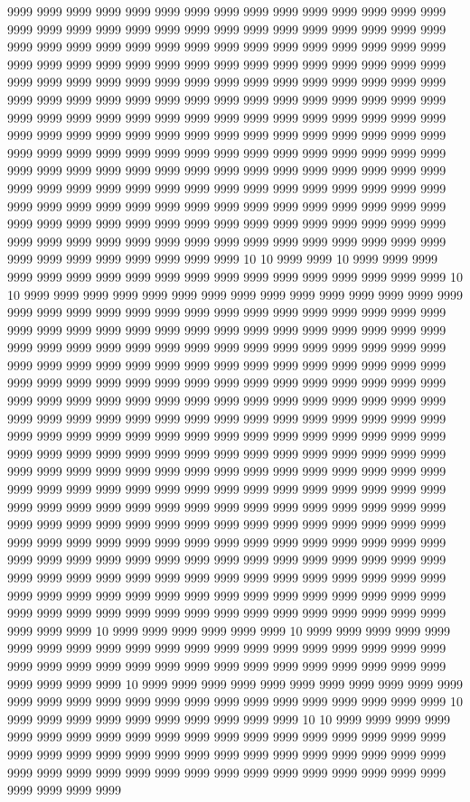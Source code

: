 9999 9999 9999 9999 9999 9999 9999 9999 9999 9999 9999 9999 9999 9999 9999 9999 9999 9999 9999 9999 9999 9999 9999 9999 9999 9999 9999 9999 9999 9999 9999 9999 9999 9999 9999 9999 9999 9999 9999 9999 9999 9999 9999 9999 9999 9999 9999 9999 9999 9999 9999 9999 9999 9999 9999 9999 9999 9999 9999 9999 9999 9999 9999 9999 9999 9999 9999 9999 9999 9999 9999 9999 9999 9999 9999 9999 9999 9999 9999 9999 9999 9999 9999 9999 9999 9999 9999 9999 9999 9999 9999 9999 9999 9999 9999 9999 9999 9999 9999 9999 9999 9999 9999 9999 9999 9999 9999 9999 9999 9999 9999 9999 9999 9999 9999 9999 9999 9999 9999 9999 9999 9999 9999 9999 9999 9999 9999 9999 9999 9999 9999 9999 9999 9999 9999 9999 9999 9999 9999 9999 9999 9999 9999 9999 9999 9999 9999 9999 9999 9999 9999 9999 9999 9999 9999 9999 9999 9999 9999 9999 9999 9999 9999 9999 9999 9999 9999 9999 9999 9999 9999 9999 9999 9999 9999 9999 9999 9999 9999 9999 9999 9999 9999 9999 9999 9999 9999 9999 9999 9999 9999 9999 9999 9999 9999 9999 9999 9999 9999 9999 9999 9999 9999 9999 9999 9999 9999 9999 9999 9999 9999 9999 9999 9999 9999 9999 9999 9999 10 10 9999 9999 10 9999 9999 9999 9999 9999 9999 9999 9999 9999 9999 9999 9999 9999 9999 9999 9999 9999 9999 10 10 9999 9999 9999 9999 9999 9999 9999 9999 9999 9999 9999 9999 9999 9999 9999 9999 9999 9999 9999 9999 9999 9999 9999 9999 9999 9999 9999 9999 9999 9999 9999 9999 9999 9999 9999 9999 9999 9999 9999 9999 9999 9999 9999 9999 9999 9999 9999 9999 9999 9999 9999 9999 9999 9999 9999 9999 9999 9999 9999 9999 9999 9999 9999 9999 9999 9999 9999 9999 9999 9999 9999 9999 9999 9999 9999 9999 9999 9999 9999 9999 9999 9999 9999 9999 9999 9999 9999 9999 9999 9999 9999 9999 9999 9999 9999 9999 9999 9999 9999 9999 9999 9999 9999 9999 9999 9999 9999 9999 9999 9999 9999 9999 9999 9999 9999 9999 9999 9999 9999 9999 9999 9999 9999 9999 9999 9999 9999 9999 9999 9999 9999 9999 9999 9999 9999 9999 9999 9999 9999 9999 9999 9999 9999 9999 9999 9999 9999 9999 9999 9999 9999 9999 9999 9999 9999 9999 9999 9999 9999 9999 9999 9999 9999 9999 9999 9999 9999 9999 9999 9999 9999 9999 9999 9999 9999 9999 9999 9999 9999 9999 9999 9999 9999 9999 9999 9999 9999 9999 9999 9999 9999 9999 9999 9999 9999 9999 9999 9999 9999 9999 9999 9999 9999 9999 9999 9999 9999 9999 9999 9999 9999 9999 9999 9999 9999 9999 9999 9999 9999 9999 9999 9999 9999 9999 9999 9999 9999 9999 9999 9999 9999 9999 9999 9999 9999 9999 9999 9999 9999 9999 9999 9999 9999 9999 9999 9999 9999 9999 9999 9999 9999 9999 9999 9999 9999 9999 9999 9999 9999 9999 9999 9999 9999 9999 9999 9999 9999 9999 9999 9999 9999 9999 9999 9999 9999 9999 9999 9999 9999 9999 9999 9999 9999 9999 9999 9999 9999 9999 10 9999 9999 9999 9999 9999 9999 10 9999 9999 9999 9999 9999 9999 9999 9999 9999 9999 9999 9999 9999 9999 9999 9999 9999 9999 9999 9999 9999 9999 9999 9999 9999 9999 9999 9999 9999 9999 9999 9999 9999 9999 9999 9999 9999 9999 9999 10 9999 9999 9999 9999 9999 9999 9999 9999 9999 9999 9999 9999 9999 9999 9999 9999 9999 9999 9999 9999 9999 9999 9999 9999 9999 9999 10 9999 9999 9999 9999 9999 9999 9999 9999 9999 9999 10 10 9999 9999 9999 9999 9999 9999 9999 9999 9999 9999 9999 9999 9999 9999 9999 9999 9999 9999 9999 9999 9999 9999 9999 9999 9999 9999 9999 9999 9999 9999 9999 9999 9999 9999 9999 9999 9999 9999 9999 9999 9999 9999 9999 9999 9999 9999 9999 9999 9999 9999 9999 9999 9999 